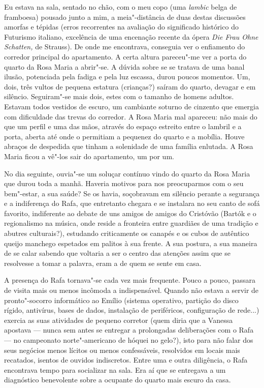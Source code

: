 Eu estava na sala, sentado no chão, com o meu copo (uma
\emph{lambic }belga de framboesa) pousado junto a mim, a meia"-distância de duas destas discussões amorfas e tépidas (erros
recorrentes na avaliação do significado histórico do Futurismo italiano,
excelência de uma encenação recente da ópera \emph{Die Frau Ohne
Schatten, }de Strauss). De onde me encontrava, conseguia ver o
enfiamento do corredor principal do apartamento. A certa altura
pareceu"-me ver a porta do quarto da Rosa Maria a abrir"-se. A dúvida
sobre se se tratava de uma banal ilusão, potenciada pela fadiga e pela
luz escassa, durou poucos momentos. Um, dois, três vultos de pequena
estatura (crianças?) saíram do quarto, devagar e em silêncio. Seguiram"-se mais dois,
estes com o tamanho de homens adultos. Estavam todos vestidos de escuro,
um cambiante soturno de cinzento que emergia com dificuldade das trevas
do corredor. A Rosa Maria mal apareceu: não mais do que um perfil e uma
das mãos, através do espaço estreito entre o lambril e a porta, aberta
até onde o permitiam a pequenez do quarto e a mobília. Houve abraços de
despedida que tinham a solenidade de uma família enlutada. A Rosa Maria
ficou a vê"-los sair do apartamento, um por um.

No dia seguinte, ouvia"-se um soluçar contínuo vindo do quarto da Rosa
Maria que durou toda a manhã. Haveria motivos para nos preocuparmos
com o seu bem"-estar, a sua saúde? Se os havia, soçobravam em silêncio
perante a segurança e a indiferença do Rafa, que entretanto chegara e se
instalara no seu canto de sofá favorito, indiferente ao debate de uns
amigos de amigos do Cristóvão (Bartók e o regionalismo na música, onde
reside a fronteira entre guardiães de uma tradição e abutres
culturais?), estudando criticamente os canapés e os cubos de autêntico
queijo manchego espetados em palitos à sua frente. A sua postura, a sua
maneira de se calar sabendo que voltaria a ser o centro das atenções
assim que se resolvesse a tomar a palavra, eram a de quem se sente em
casa.

A presença do Rafa tornava"-se cada vez mais frequente. Pouco a pouco,
passara de visita mais ou menos incômoda a indispensável. Quando não
estava a servir de pronto"-socorro informático ao Emílio (sistema
operativo, partição do disco rígido, antivírus, bases de dados,
instalação de periféricos, configuração de rede...) exercia as suas
atividades de pequeno corretor (quem diria que a Vanessa apostava ---
nunca sem antes se entregar a prolongadas deliberações com o Rafa --- no
campeonato norte"-americano de hóquei no gelo?), isto para não falar dos
seus negócios menos lícitos ou menos confessáveis, resolvidos em
locais mais recatados, isentos de ouvidos indiscretos. Entre uma e outra
diligência, o Rafa encontrava tempo para socializar na sala. Era aí que
se entregava a um diagnóstico benevolente sobre a ocupante do quarto
mais escuro da casa.

